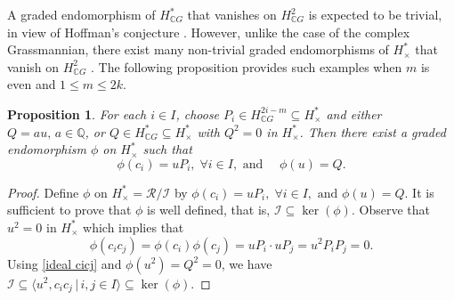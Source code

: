 \documentclass{amsart}
\newtheorem{proposition}[theorem]{Proposition}
\begin{document}
   A graded endomorphism of $H^*_{\mathbb CG}$ that vanishes on
   $H^2_{\mathbb CG}$ is expected to be trivial, in view of Hoffman’s conjecture \cite{hoffman}. However, unlike the case of the complex Grassmannian, there exist many non-trivial graded endomorphisms of $H^*_\times$ that vanish on $H^2_{\mathbb CG}$%
. The following proposition provides %
such examples when $m$ is even and   $1\le m \le 2k$.



	
	
	\begin{proposition}
		For each $i\in I$, choose $P_i \in H^{2i-m}_{\mathbb C G} \subseteq H^*_\times$ and either $Q = au,\, a\in \mathbb Q$, or  $Q\in H^*_{\mathbb CG}\subseteq H^*_{\times}$ with $Q^2=0$  in $ H^*_{\times}$. Then there exist a graded endomorphism $\phi$ on $H^*_\times$ such that 
		\[
		\phi(c_i)=uP_i, \; \forall i\in I, \text{ and  } \quad \phi(u)=Q.
		\]
	\end{proposition}
	\begin{proof}
		Define $\phi$ on $H^*_{\times} = \mathcal{R}/\mathcal{I}$ by $\phi(c_i)=uP_i, \; \forall i\in I, \text{ and } \phi(u)=Q.$ It is sufficient to prove that $\phi$ is well defined, that is, $\mathcal{I}\subseteq \ker (\phi)$. Observe that $u^2 =0$ in $H^*_{\times}$ which implies that \begin{equation}\label{ideal cicj}
			\phi(c_i c_j) = \phi(c_i) \phi(c_j) = uP_i \cdot uP_j = u^2 P_i P_j = 0.
		\end{equation} Using \eqref{ideal cicj} and $\phi(u^2)=Q^2 =0$, we have $\mathcal{I}\subseteq \langle u^2, c_i c_j \,|\, i,j \in I \rangle \subseteq \ker(\phi).$ 
	\end{proof}
	
	
\end{document}

